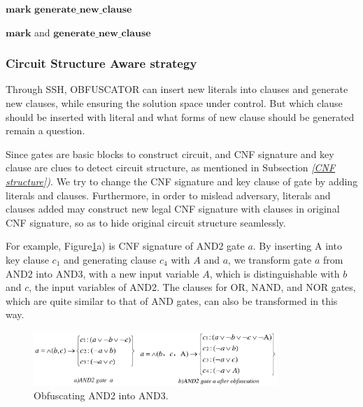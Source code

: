 \documentclass[conference,compsocconf]{IEEEtran}
\begin{document}
\begin{algorithm}[t]
$\mathbf{mark}$\;
$\mathbf{generate\_new\_clause}$\;
\caption{$\mathbf{mark}$ and $\mathbf{generate\_new\_clause}$}
\label{algo_mark}
\end{algorithm}


\subsubsection{Circuit Structure Aware strategy}\label{embeded strategy}
Through SSH, OBFUSCATOR can insert new literals into clauses and generate new clauses, 
while ensuring the solution space under control.
But which clause should be inserted with literal and what forms of new clause should be generated remain a question.

Since gates are basic blocks to construct circuit, 
and CNF signature and key clause are clues to detect circuit structure, 
as mentioned in Subsection \textit{\ref{CNF structure})}.
We try to change the CNF signature and key clause of gate by adding literals and clauses.
Furthermore, in order to mislead adversary, 
literals and clauses added may construct new legal CNF signature with clauses in original CNF signature, 
so as to hide original circuit structure seamlessly.

For example, Figure\ref{fig_AND2}a) is CNF signature of AND2 gate $a$.
By inserting A into key clause $c_1$ and generating clause $c_4$ with $A$ and $a$, 
we transform gate $a$ from AND2 into AND3, with a new input variable $A$, 
which is distinguishable with $b$ and $c$, the input variables of AND2.
The clauses for OR, NAND, and NOR gates, 
which are quite similar to that of AND gates,
can also be transformed in this way. 

\begin{figure}
\footnotesize\centering
\centerline{\includegraphics[width=9.2cm]{AND2.eps}}
\caption{Obfuscating AND2 into AND3.}\centering
\label{fig_AND2}
\end{figure}
\end{document}
